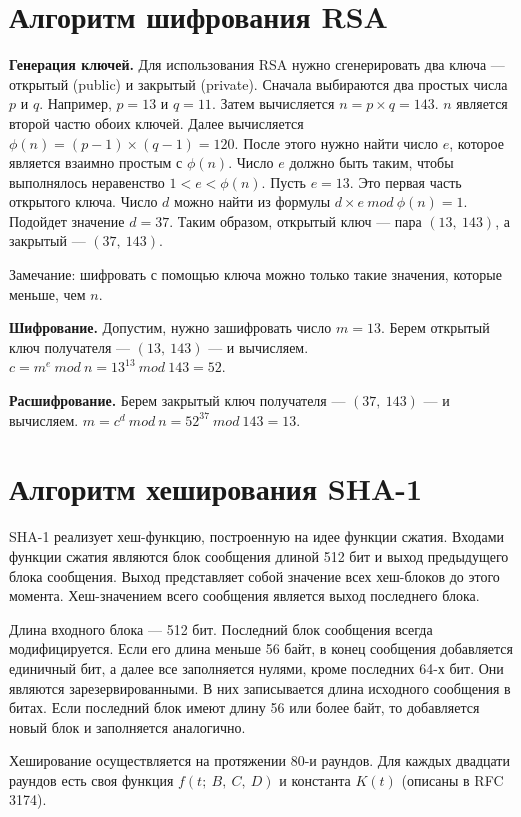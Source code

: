 \documentclass{bmstu}
\begin{document}
\chapter{Алгоритм шифрования RSA}

\textbf{Генерация ключей.} 
Для использования RSA нужно сгенерировать два ключа --- открытый (public) и закрытый (private). 
Сначала выбираются два простых числа $p$ и $q$. 
Например, $p = 13$ и $q = 11$. 
Затем вычисляется $n = p \times q = 143$. 
$n$ является второй частю обоих ключей. 
Далее вычисляется $\phi(n) = (p - 1) \times (q - 1) = 120$. 
После этого нужно найти число $e$, которое является взаимно простым с $\phi(n)$. 
Число $e$ должно быть таким, чтобы выполнялось неравенство $1 < e < \phi(n)$. 
Пусть $e = 13$. 
Это первая часть открытого ключа. 
Число $d$ можно найти из формулы $d \times e~mod~\phi(n) = 1$. 
Подойдет значение $d = 37$. 
Таким образом, открытый ключ --- пара $(13,~143)$, а закрытый --- $(37,~143)$.

Замечание: шифровать с помощью ключа можно только такие значения, которые меньше, чем $n$.

\textbf{Шифрование.} 
Допустим, нужно зашифровать число $m = 13$. 
Берем открытый ключ получателя --- $(13,~143)$ --- и вычисляем. 
$c = m^e~mod~n = 13^{13}~mod~143 = 52$.

\textbf{Расшифрование.} 
Берем закрытый ключ получателя --- $(37,~143)$ --- и вычисляем. 
$m = c^d~mod~n = 52^{37}~mod~143 = 13$.

\chapter{Алгоритм хеширования SHA-1}

SHA-1 реализует хеш-функцию, построенную на идее функции сжатия. 
Входами функции сжатия являются блок сообщения длиной 512 бит и выход предыдущего блока сообщения. 
Выход представляет собой значение всех хеш-блоков до этого момента. 
Хеш-значением всего сообщения является выход последнего блока.

Длина входного блока --- 512 бит. 
Последний блок сообщения всегда модифицируется. 
Если его длина меньше 56 байт, в конец сообщения добавляется единичный бит, а далее все заполняется нулями, кроме последних 64-х бит. 
Они являются зарезервированными. 
В них записывается длина исходного сообщения в битах. 
Если последний блок имеют длину 56 или более байт, то добавляется новый блок и заполняется аналогично.

Хеширование осуществляется на протяжении 80-и раундов. 
Для каждых двадцати раундов есть своя функция $f(t;~B,~C,~D)$ и константа $K(t)$ (описаны в RFC 3174).
\end{document}
